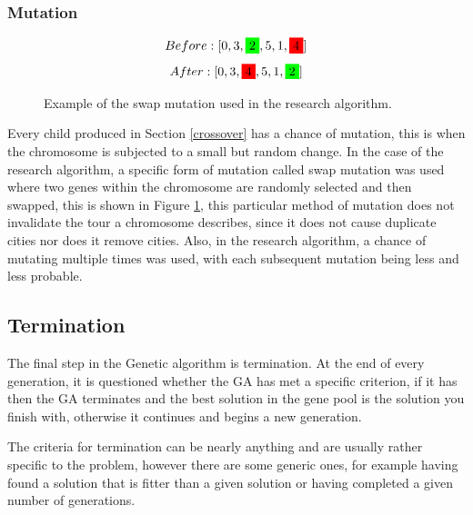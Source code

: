 \subsubsection{Mutation}
\par
\begin{figure}[H]
\[Before: [0,3,\colorbox{green}{2},5,1,\colorbox{red}{4}]\]
\[After: [0,3,\colorbox{red}{4},5,1,\colorbox{green}{2}]\]
\caption{Example of the swap mutation used in the research algorithm. \label{fig:mut}}
\end{figure}
Every child produced in Section \ref{crossover} has a chance of mutation, this is when the chromosome is subjected to a small but random change. In the case of the research algorithm, a specific form of mutation called swap mutation was used where two genes within the chromosome are randomly selected and then swapped, this is shown in Figure \ref{fig:mut}, this particular method of mutation does not invalidate the tour a chromosome describes, since it does not cause duplicate cities nor does it remove cities. Also, in the research algorithm, a chance of mutating multiple times was used, with each subsequent mutation being less and less probable.
\subsection{Termination}
\par
The final step in the Genetic algorithm is termination. At the end of every generation, it is questioned whether the GA has met a specific criterion, if it has then the GA terminates and the best solution in the gene pool is the solution you finish with, otherwise it continues and begins a new generation.
\par
The criteria for termination can be nearly anything and are usually rather specific to the problem, however there are some generic ones, for example having found a solution that is fitter than a given solution or having completed a given number of generations.
